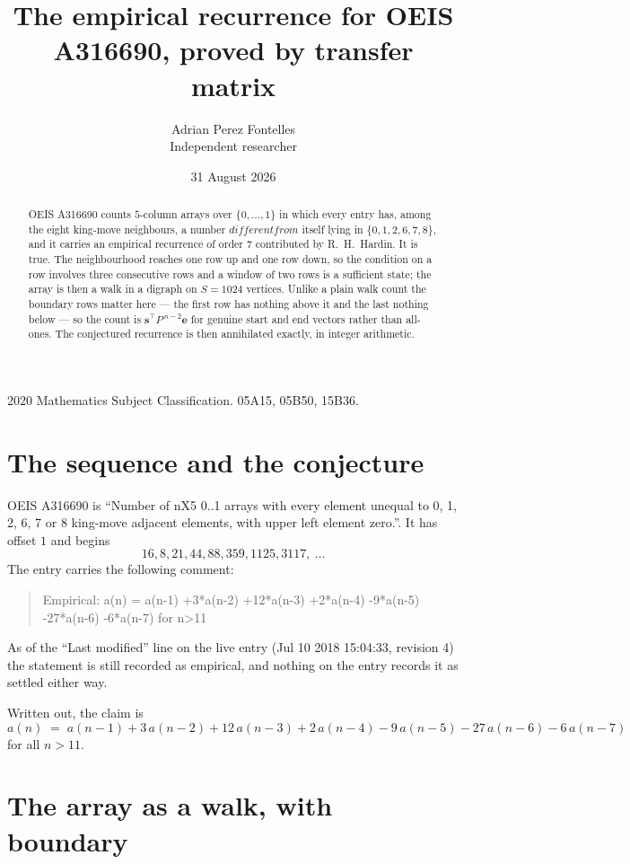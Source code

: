 \documentclass[11pt,a4paper]{article}
\title{The empirical recurrence for OEIS A316690, proved by transfer matrix}
\author{Adrian Perez Fontelles\\ \small Independent researcher}
\date{31 August 2026}
\theoremstyle{plain}
\theoremstyle{definition}
\begin{document}
\maketitle

\begin{abstract}
OEIS A316690 counts $5$-column arrays over $\{0,\dots,1\}$ in which every entry has,
among the eight king-move neighbours, a number $different from$ itself lying in $\{0,1,2,6,7,8\}$, and it carries an empirical
recurrence of order $7$ contributed by R.~H.~Hardin. It is true. The neighbourhood
reaches one row up and one row down, so the condition on a row involves three consecutive
rows and a window of two rows is a sufficient state; the array is then a walk in a digraph
on $S=1024$ vertices. Unlike a plain walk count the boundary rows matter here --- the first
row has nothing above it and the last nothing below --- so the count is
$\mathbf{s}^{\!\top}P^{\,n-2}\mathbf{e}$ for genuine start and end vectors rather than
all-ones. The conjectured recurrence is then annihilated exactly, in integer arithmetic.
\end{abstract}

\noindent\small 2020 Mathematics Subject Classification. 05A15, 05B50, 15B36.\normalsize

\section{The sequence and the conjecture}

OEIS A316690 is ``Number of nX5 0..1 arrays with every element unequal to 0, 1, 2, 6, 7 or 8 king-move adjacent elements, with upper left element zero.''. It has offset
$1$ and begins
\[
16, 8, 21, 44, 88, 359, 1125, 3117,\ \dots
\]
The entry carries the following comment:
\begin{quote}\small
Empirical: a(n) = a(n-1) +3*a(n-2) +12*a(n-3) +2*a(n-4) -9*a(n-5) -27*a(n-6) -6*a(n-7) for n>11
\end{quote}
As of the ``Last modified'' line on the live entry (Jul 10 2018 15:04:33, revision
4) the statement is still recorded as empirical, and nothing on the entry
records it as settled either way.

Written out, the claim is
\begin{equation}\label{eq:conj}
a(n)\;=\;a(n-1) + 3\,a(n-2) + 12\,a(n-3) + 2\,a(n-4) - 9\,a(n-5) - 27\,a(n-6) - 6\,a(n-7)
\end{equation}
for all $n>11$.

\section{The array as a walk, with boundary}
\end{document}
